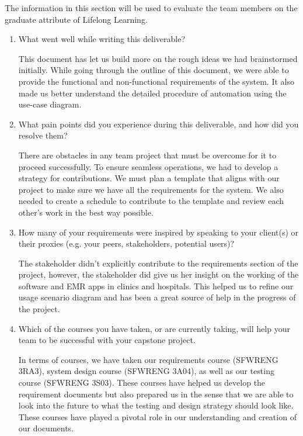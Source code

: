 \documentclass[12pt]{article}
\begin{document}

The information in this section will be used to evaluate the team members on the
graduate attribute of Lifelong Learning.  



\begin{enumerate}
  \item What went well while writing this deliverable?
  
  This document has let us build more on the rough ideas we had brainstormed initially. While going through the outline of this document, we were able to provide the functional and non-functional requirements of the system. It also made us better understand the detailed procedure of automation using the use-case diagram. 

  \item What pain points did you experience during this deliverable, and how did
  you resolve them?

  There are obstacles in any team project that must be overcome for it to proceed successfully. To ensure seamless operations, we had to develop a strategy for contributions. We must plan a template that aligns with our project to make sure we have all the requirements for the system. We also needed to create a schedule to contribute to the template and review each other’s work in the best way possible.
  
  \item How many of your requirements were inspired by speaking to your
  client(s) or their proxies (e.g. your peers, stakeholders, potential users)?

  The stakeholder didn’t explicitly contribute to the requirements section of the project, however, the stakeholder did give us her insight on the working of the software and EMR apps in clinics and hospitals. This helped us to refine our usage scenario diagram and has been a great source of help in the progress of the project.

  \item Which of the courses you have taken, or are currently taking, will help
  your team to be successful with your capstone project.

  In terms of courses, we have taken our requirements course (SFWRENG 3RA3), system design course (SFWRENG 3A04), as well as our testing course (SFWRENG 3S03). These courses have helped us develop the requirement documents but also prepared us in the sense that we are able to look into the future to what the testing and design strategy should look like. These courses have played a pivotal role in our understanding and creation of our documents. 


\end{enumerate}
\end{document}
